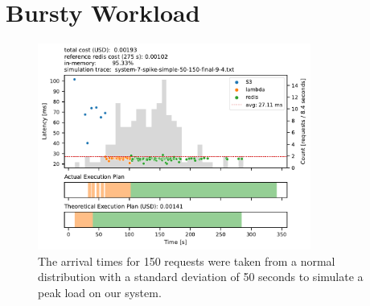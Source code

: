 \section{Bursty Workload}
\label{subsec:peak_workload}

\begin{figure}[t]
    \begin{center}
        \includegraphics[width=0.8\textwidth]{figures/system-7-spike-simple-50-150-final-9-4.pdf}
        \caption{The arrival times for 150 requests were taken from a normal distribution with a standard deviation of 50 seconds to simulate a peak load on our system.}
        \label{fig:spike_1}
    \end{center}
\end{figure}


